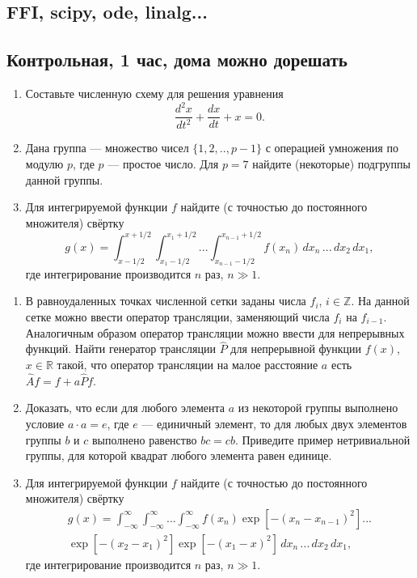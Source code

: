 \documentclass{book}
\begin{document}
\subsection{FFI, scipy, ode, linalg...}

\subsection{Контрольная, 1 час, дома можно дорешать}

\begin{enumerate}
    \item Составьте численную схему для решения уравнения
        \begin{equation}
            \frac{d^2 x}{dt^2} + \frac{dx}{dt} + x = 0.
        \end{equation}
    \item Дана группа --- множество чисел $\{1,2,..,p - 1\}$ с операцией умножения по модулю $p$,
        где $p$ --- простое число. Для $p = 7$ найдите (некоторые) подгруппы данной группы.
    \item Для интегрируемой функции $f$ найдите (с точностью до постоянного множителя) свёртку
        \begin{equation}
            g(x) = \int_{x - 1/2}^{x + 1/2} \int_{x_1 - 1/2}^{x_1 + 1/2} ... \int_{x_{n - 1} -
            1/2}^{x_{n - 1} + 1/2}
            f(x_n) \, dx_n \,
            ... \, dx_2 \, dx_1,
        \end{equation}
        где интегрирование производится $n$ раз, $n \gg 1$.
\end{enumerate}

\begin{enumerate}
    \item В равноудаленных точках численной сетки заданы числа $f_i$, $i \in \mathbb Z$.  На данной
        сетке можно ввести оператор трансляции, заменяющий числа $f_i$ на $f_{i - 1}$. Аналогичным
        образом оператор
        трансляции можно ввести для непрерывных функций. Найти генератор трансляции $\hat P$ для
        непрерывной функции $f(x)$, $x \in \mathbb R$ такой, что оператор трансляции на малое
        расстояние $a$ есть $\hat A f = f + a \hat P f$.
    \item Доказать, что если для любого элемента $a$ из некоторой группы выполнено условие $a \cdot
        a = e$, где $e$ --- единичный элемент, то для любых двух элементов группы $b$ и $c$
        выполнено равенство $bc = cb$. Приведите пример нетривиальной группы, для которой квадрат
        любого элемента равен единице.
    \item Для интегрируемой функции $f$ найдите (с точностью до постоянного множителя) свёртку
        \begin{multline}
            g(x) = \int_{-\infty}^\infty \int_{-\infty}^\infty ... \int_{-\infty}^\infty
            f(x_n) \exp\left[-(x_n - x_{n - 1})^2 \right] ...\\
            \exp\left[-(x_2 - x_1)^2 \right]
            \exp\left[-(x_1 - x)^2 \right]
            \, dx_n \, ... \, dx_2 \, dx_1,
        \end{multline}
        где интегрирование производится $n$ раз, $n \gg 1$.
\end{enumerate}
\end{document}
